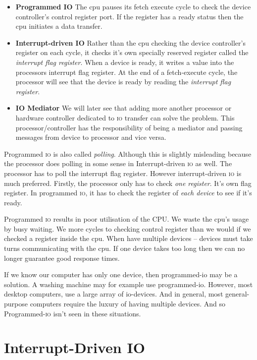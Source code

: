 \begin{itemize}   
\renewcommand{\labelitemi}{$\Box$}
\item \textbf{Programmed IO} 
The cpu pauses its fetch execute cycle to check the device controller’s control register port. 
If the register has a ready status then the cpu initiates a data transfer. 
\item \textbf{Interrupt-driven IO} 
Rather than the cpu checking the device controller's register on each cycle, it 
checks it's own specially reserved register called the \textit{interrupt flag register}. 
When a device is ready, it writes a value into the processors interrupt flag register.
At the end of a fetch-execute cycle, the processor will see that the device is ready 
by reading the \textit{interrupt flag register}. 
\item \textbf{IO Mediator} 
We will later see that adding more another processor or hardware controller dedicated 
to \textsc{io} transfer can solve the problem. This processor/controller has the responsibility 
of being a mediator and passing messages from device to processor and vice versa. 
\end{itemize}

Programmed \textsc{io} is also called \textit{polling}. Although this is slightly misleading because 
the processor does polling in some sense in Interrupt-driven \textsc{io} as well. The processor 
has to poll the interrupt flag register. However interrupt-driven \textsc{io} is much preferred.
Firstly, the processor only has to check \textit{one register}. 
It's own flag register. In programmed \textsc{io}, it has to check the register 
of \textit{each device} to see if it's ready. 

Programmed \textsc{io} results in poor utilisation of the CPU. 
We waste the cpu’s usage by busy waiting. We more cycles to checking control register than 
we would if we checked a register inside the cpu. 
When have multiple devices – devices must take turns communicating with the cpu. 
If one device takes too long then we can no longer guarantee good response times.

If we know our computer has only one device, then programmed-io may be a solution. A washing machine may for example use programmed-io. However, most desktop computers, use a large array of io-devices. And in general, most general-purpose computers require the luxury of having multiple devices. And so Programmed-\textsc{io} isn’t seen in these situations. 


\section{Interrupt-Driven IO}

